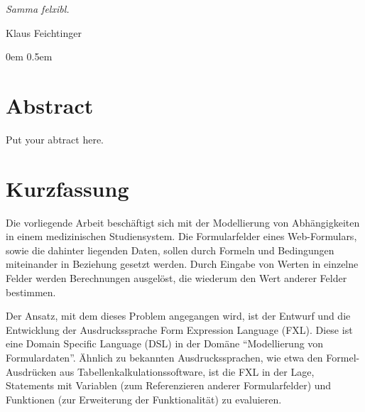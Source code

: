 \documentclass [11pt,smallheadings, a4paper]{report}
\begin{document}
\newenvironment{myquote}%
{\begin{quote}\small}%
{\end{quote}}%


\noindent
\emph{Samma felxibl.}
\begin{flushright}
Klaus Feichtinger
\end{flushright}
\pagestyle{headings}
\tableofcontents


\pagestyle{headings}


\parindent0em
\parskip0.5em

\sloppy 


\chapter*{Abstract}
Put your abtract here.

\chapter*{Kurzfassung}
Die vorliegende Arbeit beschäftigt sich mit der Modellierung von Ab\-hän\-gig\-kei\-ten in einem medizinischen Studiensystem. Die Formularfelder eines Web-Formulars, sowie die dahinter liegenden Daten, sollen durch Formeln und Bedingungen miteinander in Beziehung gesetzt werden. Durch Eingabe von Werten in einzelne Felder werden Berechnungen ausgelöst, die wiederum den Wert anderer Felder bestimmen.

Der Ansatz, mit dem dieses Problem angegangen wird, ist der Entwurf und die Entwicklung der Ausdruckssprache Form Expression Language (FXL). Diese ist eine Domain Specific Language (DSL) in der Domäne ``Modellierung von Formulardaten''. Ähnlich zu bekannten Ausdruckssprachen, wie etwa den Formel-Ausdrücken aus Tabellenkalkulationssoftware, ist die FXL in der Lage, Statements mit Variablen (zum Referenzieren anderer For\-mu\-lar\-fel\-der) und Funktionen (zur Erweiterung der Funktionalität) zu evaluieren.
\end{document}
